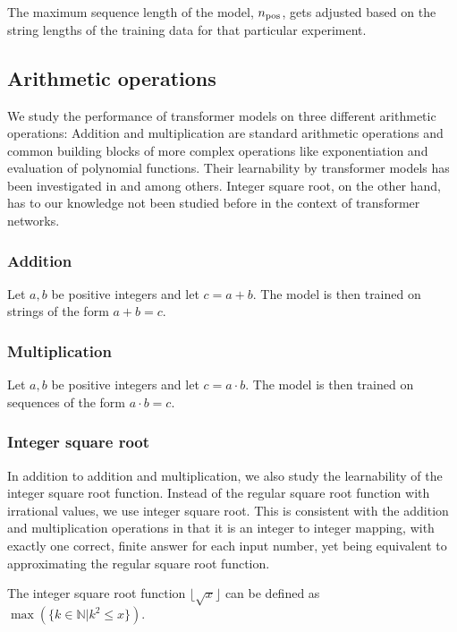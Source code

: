 The maximum sequence length of the model, ${n_\textrm{pos}}$, gets adjusted based on the string lengths of the training data for that particular experiment.


\subsection{Arithmetic operations}

We study the performance of transformer models on three different arithmetic operations: Addition and multiplication are standard arithmetic operations and common building blocks of more complex operations like exponentiation and evaluation of polynomial functions. Their learnability by transformer models has been investigated in \cite{teaching} and \cite{visual} among others. Integer square root, on the other hand, has to our knowledge not been studied before in the context of transformer networks.

\subsubsection{Addition}
Let $a, b$ be positive integers and let $c=a+b$. The model is then trained on strings of the form $a+b=c$.


\subsubsection{Multiplication}

Let $a, b$ be positive integers and let $c=a \cdot b$. The model is then trained on sequences of the form $a \cdot b=c$.

\subsubsection{Integer square root}
\label{isqrt}

In addition to addition and multiplication, we also study the learnability of the integer square root function. Instead of the regular square root function with irrational values, we use integer square root. This is consistent with the addition and multiplication operations in that it is an integer to integer mapping, with exactly one correct, finite answer for each input number, yet being equivalent to approximating the regular square root function.

The integer square root function $\lfloor \sqrt{x} \rfloor$ can be defined as $\max(\{ k \in \mathbb{N} | k^2 \leq x \})$.

